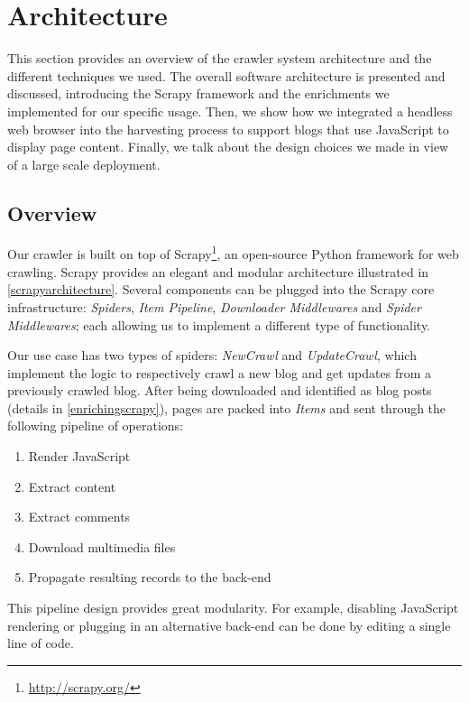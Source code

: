 \section{Architecture}
\label{architecture}

This section provides an overview of the crawler system architecture and the different techniques we used. The overall software architecture is presented and discussed, introducing the Scrapy framework and the enrichments we implemented for our specific usage. Then, we show how we integrated a headless web browser into the harvesting process to support blogs that use JavaScript to display page content. Finally, we talk about the design choices we made in view of a large scale deployment.

\subsection{Overview}

Our crawler is built on top of Scrapy\footnote{\label{scrapy}\url{http://scrapy.org/}}, an open-source Python framework for web crawling. Scrapy provides an elegant and modular architecture illustrated in \autoref{scrapyarchitecture}. Several components can be plugged into the Scrapy core infrastructure: \emph{Spiders}, \emph{Item Pipeline}, \emph{Downloader Middlewares} and \emph{Spider Middlewares}; each allowing us to implement a different type of functionality.

Our use case has two types of spiders: \emph{NewCrawl} and \emph{UpdateCrawl}, which implement the logic to respectively crawl a new blog and get updates from a previously crawled blog. After being downloaded and identified as blog posts (details in \autoref{enrichingscrapy}), pages are packed into \emph{Items} and sent through the following pipeline of operations:
\begin{enumerate}
  \item Render JavaScript
  \item Extract content
  \item Extract comments
  \item Download multimedia files
  \item Propagate resulting records to the back-end
\end{enumerate}
This pipeline design provides great modularity. For example, disabling JavaScript rendering or plugging in an alternative back-end can be done by editing a single line of code.

